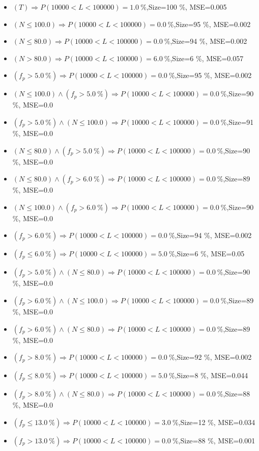 \documentclass[numbered]{CSL}
\begin{document}
\begin{itemize}
\item $(T) \Rightarrow P(10 000 < L < 100 000) = 1.0~\%$,\hfill Size=100 \%, MSE=0.005
\item $(N \leq 100.0) \Rightarrow P(10 000 < L < 100 000) = 0.0~\%$,\hfill Size=95 \%, MSE=0.002
\item $(N \leq 80.0) \Rightarrow P(10 000 < L < 100 000) = 0.0~\%$,\hfill Size=94 \%, MSE=0.002
\item $(N > 80.0) \Rightarrow P(10 000 < L < 100 000) = 6.0~\%$,\hfill Size=6 \%, MSE=0.057
\item $(f_p > 5.0~\%) \Rightarrow P(10 000 < L < 100 000) = 0.0~\%$,\hfill Size=95 \%, MSE=0.002
\item $(N \leq 100.0) \land (f_p > 5.0~\%) \Rightarrow P(10 000 < L < 100 000) = 0.0~\%$,\hfill Size=90 \%, MSE=0.0
\item $(f_p > 5.0~\%) \land (N \leq 100.0) \Rightarrow P(10 000 < L < 100 000) = 0.0~\%$,\hfill Size=91 \%, MSE=0.0
\item $(N \leq 80.0) \land (f_p > 5.0~\%) \Rightarrow P(10 000 < L < 100 000) = 0.0~\%$,\hfill Size=90 \%, MSE=0.0
\item $(N \leq 80.0) \land (f_p > 6.0~\%) \Rightarrow P(10 000 < L < 100 000) = 0.0~\%$,\hfill Size=89 \%, MSE=0.0
\item $(N \leq 100.0) \land (f_p > 6.0~\%) \Rightarrow P(10 000 < L < 100 000) = 0.0~\%$,\hfill Size=90 \%, MSE=0.0
\item $(f_p > 6.0~\%) \Rightarrow P(10 000 < L < 100 000) = 0.0~\%$,\hfill Size=94 \%, MSE=0.002
\item $(f_p \leq 6.0~\%) \Rightarrow P(10 000 < L < 100 000) = 5.0~\%$,\hfill Size=6 \%, MSE=0.05
\item $(f_p > 5.0~\%) \land (N \leq 80.0) \Rightarrow P(10 000 < L < 100 000) = 0.0~\%$,\hfill Size=90 \%, MSE=0.0
\item $(f_p > 6.0~\%) \land (N \leq 100.0) \Rightarrow P(10 000 < L < 100 000) = 0.0~\%$,\hfill Size=89 \%, MSE=0.0
\item $(f_p > 6.0~\%) \land (N \leq 80.0) \Rightarrow P(10 000 < L < 100 000) = 0.0~\%$,\hfill Size=89 \%, MSE=0.0
\item $(f_p > 8.0~\%) \Rightarrow P(10 000 < L < 100 000) = 0.0~\%$,\hfill Size=92 \%, MSE=0.002
\item $(f_p \leq 8.0~\%) \Rightarrow P(10 000 < L < 100 000) = 5.0~\%$,\hfill Size=8 \%, MSE=0.044
\item $(f_p > 8.0~\%) \land (N \leq 80.0) \Rightarrow P(10 000 < L < 100 000) = 0.0~\%$,\hfill Size=88 \%, MSE=0.0
\item $(f_p \leq 13.0~\%) \Rightarrow P(10 000 < L < 100 000) = 3.0~\%$,\hfill Size=12 \%, MSE=0.034
\item $(f_p > 13.0~\%) \Rightarrow P(10 000 < L < 100 000) = 0.0~\%$,\hfill Size=88 \%, MSE=0.001
\end{itemize}
\end{document}
